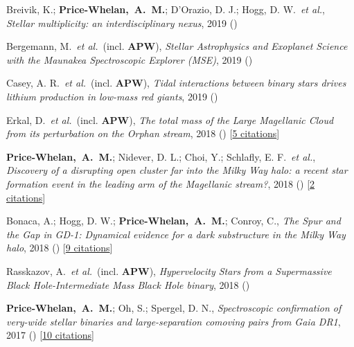 \item[{\color{deemph}\scriptsize8}]Breivik, K.; \textbf{Price-Whelan,~A.~M.}; D'Orazio, D. J.; Hogg, D. W.~\textit{et al.}, \textit{Stellar multiplicity: an interdisciplinary nexus}, 2019 ()

\item[{\color{deemph}\scriptsize7}]Bergemann, M.~\textit{et al.}~(incl. \textbf{APW}), \textit{Stellar Astrophysics and Exoplanet Science with the Maunakea Spectroscopic Explorer (MSE)}, 2019 ()

\item[{\color{deemph}\scriptsize6}]Casey, A. R.~\textit{et al.}~(incl. \textbf{APW}), \textit{Tidal interactions between binary stars drives lithium production in low-mass red giants}, 2019 ()

\item[{\color{deemph}\scriptsize5}]Erkal, D.~\textit{et al.}~(incl. \textbf{APW}), \textit{The total mass of the Large Magellanic Cloud from its perturbation on the Orphan stream}, 2018 () [\href{http://adsabs.harvard.edu/abs/2018arXiv181208192E}{5 citations}]

\item[{\color{deemph}\scriptsize4}]\textbf{Price-Whelan,~A.~M.}; Nidever, D. L.; Choi, Y.; Schlafly, E. F.~\textit{et al.}, \textit{Discovery of a disrupting open cluster far into the Milky Way halo: a recent star formation event in the leading arm of the Magellanic stream?}, 2018 () [\href{http://adsabs.harvard.edu/abs/2018arXiv181105991P}{2 citations}]

\item[{\color{deemph}\scriptsize3}]Bonaca, A.; Hogg, D. W.; \textbf{Price-Whelan,~A.~M.}; Conroy, C., \textit{The Spur and the Gap in GD-1: Dynamical evidence for a dark substructure in the Milky Way halo}, 2018 () [\href{http://adsabs.harvard.edu/abs/2018arXiv181103631B}{9 citations}]

\item[{\color{deemph}\scriptsize2}]Rasskazov, A.~\textit{et al.}~(incl. \textbf{APW}), \textit{Hypervelocity Stars from a Supermassive Black Hole-Intermediate Mass Black Hole binary}, 2018 ()

\item[{\color{deemph}\scriptsize1}]\textbf{Price-Whelan,~A.~M.}; Oh, S.; Spergel, D. N., \textit{Spectroscopic confirmation of very-wide stellar binaries and large-separation comoving pairs from Gaia DR1}, 2017 () [\href{http://adsabs.harvard.edu/abs/2017arXiv170903532P}{10 citations}]